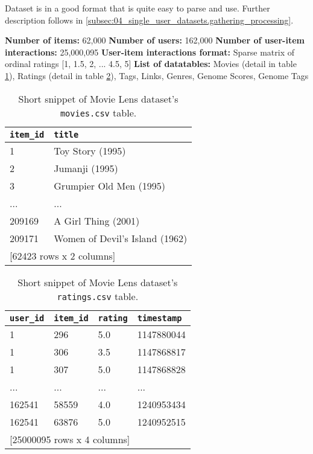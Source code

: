 Dataset is in a good format that is quite easy to parse and use. Further description follows in \ref{subsec:04_single_user_datasets.gathering_processing}.

\hfill \break
\noindent
\textbf{Number of items:} 62,000 \newline
\textbf{Number of users:} 162,000 \newline
\textbf{Number of user-item interactions:} 25,000,095 \newline
\textbf{User-item interactions format:} Sparse matrix of ordinal ratings [1, 1.5, 2, ... 4.5, 5] \newline
\textbf{List of datatables:} Movies (detail in table \ref{table:5.1_ML_movies}), Ratings (detail in table \ref{table:5.1_ML_ratings}), Tags, Links, Genres, Genome Scores, Genome Tags

\begin{table}[!ht]
\centering
\begin{tabular}{ l l }
\verb|item_id| & \verb|title| \\
    \hline
     1  &                   Toy Story (1995) \\
     2  &                     Jumanji (1995) \\
     3  &            Grumpier Old Men (1995) \\
   ...  &                                ... \\
209169  &                A Girl Thing (2001) \\
209171  &     Women of Devil's Island (1962) \\ [1mm]
\multicolumn{2}{l}{{[62423 rows x 2 columns]}}
\end{tabular}
\caption{Short snippet of Movie Lens dataset's \texttt{movies.csv} table.}
\label{table:5.1_ML_movies}
\end{table}

\begin{table}[!ht]
\centering
\begin{tabular}{ l l l l }

\verb|user_id| & \verb|item_id| & \verb|rating| & \verb|timestamp| \\
    \hline
    1 &      296  &   5.0 & 1147880044 \\
    1 &      306  &   3.5 & 1147868817 \\
    1 &      307  &   5.0 & 1147868828 \\
  ... &      ...  &   ... &        ... \\
162541 &    58559  &   4.0 & 1240953434 \\
162541 &    63876  &   5.0 & 1240952515 \\ [1mm]
\multicolumn{4}{l}{{[25000095 rows x 4 columns]}}
\end{tabular}
\caption{Short snippet of Movie Lens dataset's \texttt{ratings.csv} table.}
\label{table:5.1_ML_ratings}
\end{table}

